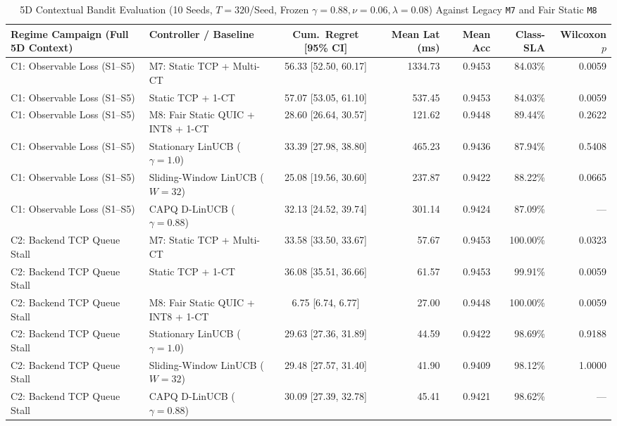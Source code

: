 \documentclass[10pt,journal,compsoc]{IEEEtran}
\begin{document}
\begin{table}[!t]
\centering
\caption{5D Contextual Bandit Evaluation (10 Seeds, $T=320$/Seed, Frozen $\gamma=0.88, \nu=0.06, \lambda=0.08$) Against Legacy \texttt{M7} and Fair Static \texttt{M8}}
\label{tab:bandit}
\footnotesize
\begin{adjustbox}{max width=\textwidth}
\begin{tabular}{llcrrrr}
\toprule
\textbf{Regime Campaign (Full 5D Context)} & \textbf{Controller / Baseline} & \textbf{Cum.\ Regret [95\% CI]} & \textbf{Mean Lat (ms)} & \textbf{Mean Acc} & \textbf{Class-SLA} & \textbf{Wilcoxon $p$} \\
\midrule
C1: Observable Loss (S1--S5) & M7: Static TCP + Multi-CT & 56.33 [52.50, 60.17] & 1334.73 & 0.9453 & 84.03\% & 0.0059 \\
C1: Observable Loss (S1--S5) & Static TCP + 1-CT & 57.07 [53.05, 61.10] & 537.45 & 0.9453 & 84.03\% & 0.0059 \\
C1: Observable Loss (S1--S5) & M8: Fair Static QUIC + INT8 + 1-CT & 28.60 [26.64, 30.57] & 121.62 & 0.9448 & 89.44\% & 0.2622 \\
C1: Observable Loss (S1--S5) & Stationary LinUCB ($\gamma=1.0$) & 33.39 [27.98, 38.80] & 465.23 & 0.9436 & 87.94\% & 0.5408 \\
C1: Observable Loss (S1--S5) & Sliding-Window LinUCB ($W=32$) & 25.08 [19.56, 30.60] & 237.87 & 0.9422 & 88.22\% & 0.0665 \\
C1: Observable Loss (S1--S5) & CAPQ D-LinUCB ($\gamma=0.88$) & 32.13 [24.52, 39.74] & 301.14 & 0.9424 & 87.09\% & --- \\
\midrule
C2: Backend TCP Queue Stall & M7: Static TCP + Multi-CT & 33.58 [33.50, 33.67] & 57.67 & 0.9453 & 100.00\% & 0.0323 \\
C2: Backend TCP Queue Stall & Static TCP + 1-CT & 36.08 [35.51, 36.66] & 61.57 & 0.9453 & 99.91\% & 0.0059 \\
C2: Backend TCP Queue Stall & M8: Fair Static QUIC + INT8 + 1-CT & 6.75 [6.74, 6.77] & 27.00 & 0.9448 & 100.00\% & 0.0059 \\
C2: Backend TCP Queue Stall & Stationary LinUCB ($\gamma=1.0$) & 29.63 [27.36, 31.89] & 44.59 & 0.9422 & 98.69\% & 0.9188 \\
C2: Backend TCP Queue Stall & Sliding-Window LinUCB ($W=32$) & 29.48 [27.57, 31.40] & 41.90 & 0.9409 & 98.12\% & 1.0000 \\
C2: Backend TCP Queue Stall & CAPQ D-LinUCB ($\gamma=0.88$) & 30.09 [27.39, 32.78] & 45.41 & 0.9421 & 98.62\% & --- \\

\end{tabular}
\end{adjustbox}
\end{table}
\end{document}
